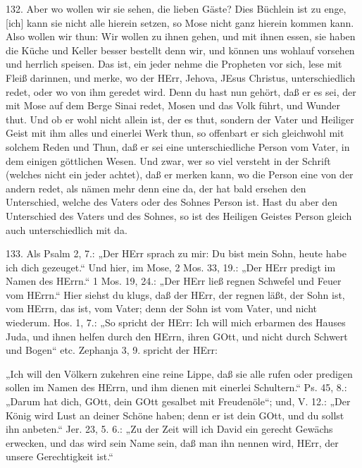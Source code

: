 132. Aber wo wollen wir sie sehen, die lieben Gäste? Dies Büchlein ist zu enge, [ich] kann sie nicht alle hierein setzen, so Mose nicht ganz hierein kommen kann. Also wollen wir thun: Wir wollen zu ihnen gehen, und mit ihnen essen, sie haben die Küche und Keller besser bestellt denn wir, und können uns wohlauf vorsehen und herrlich speisen. Das ist, ein jeder nehme die Propheten vor sich, lese mit Fleiß darinnen, und merke, wo der HErr, Jehova, JEsus Christus, unterschiedlich redet, oder wo von ihm geredet wird. Denn du hast nun gehört, daß er es sei, der mit Mose auf dem Berge Sinai redet, Mosen und das Volk führt, und Wunder thut. Und ob er wohl nicht allein ist, der es thut, sondern der Vater und Heiliger Geist mit ihm alles und einerlei Werk thun, so offenbart er sich gleichwohl mit solchem Reden und Thun, daß er sei eine unterschiedliche Person vom Vater, in dem einigen göttlichen Wesen. Und zwar, wer so viel versteht in der Schrift (welches nicht ein jeder achtet), daß er merken kann, wo die Person eine von der andern redet, als nämen mehr denn eine da, der hat bald ersehen den Unterschied, welche des Vaters oder des Sohnes Person ist. Hast du aber den Unterschied des Vaters und des Sohnes, so ist des Heiligen Geistes Person gleich auch unterschiedlich mit da.

133. Als Psalm 2, 7.: „Der HErr sprach zu mir: Du bist mein Sohn, heute habe ich dich gezeuget.“ Und hier, im Mose, 2 Mos. 33, 19.: „Der HErr predigt im Namen des HErrn.“ 1 Mos. 19, 24.: „Der HErr ließ regnen Schwefel und Feuer vom HErrn.“ Hier siehst du klugs, daß der HErr, der regnen läßt, der Sohn ist, vom HErrn, das ist, vom Vater; denn der Sohn ist vom Vater, und nicht wiederum. Hos. 1, 7.: „So spricht der HErr: Ich will mich erbarmen des Hauses Juda, und ihnen helfen durch den HErrn, ihren GOtt, und nicht durch Schwert und Bogen“ etc. Zephanja 3, 9. spricht der HErr:

„Ich will den Völkern zukehren eine reine Lippe, daß sie alle rufen oder predigen sollen im Namen des HErrn, und ihm dienen mit einerlei Schultern.“ Ps. 45, 8.: „Darum hat dich, GOtt, dein GOtt gesalbet mit Freudenöle“; und, V. 12.: „Der König wird Lust an deiner Schöne haben; denn er ist dein GOtt, und du sollst ihn anbeten.“ Jer. 23, 5. 6.: „Zu der Zeit will ich David ein gerecht Gewächs erwecken, und das wird sein Name sein, daß man ihn nennen wird, HErr, der unsere Gerechtigkeit ist.“

